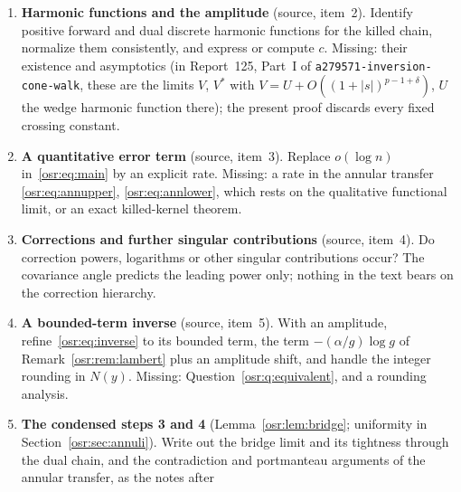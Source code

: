 \documentclass[11pt,letterpaper]{article}
\newcommand{\G}{\Gamma}\newcommand{\s}{\sqrt{17}}
\numberwithin{equation}{section}
\begin{document}
\begin{enumerate}
 \emph{Observation, not a claim.} An intake floating-point computation of
 the recurrence~\eqref{osr:eq:recurrence} (double precision with
 renormalization, not interval arithmetic) gives
 $a(n)\G^{-n}n^{\alpha}=4.154$, $4.418$, $4.557$, $4.604$, $4.627$,
 $4.641$, $4.651$ at $n=50$, $100$, $200$, $300$, $400$, $500$, $599$, still
 increasing slowly, and secant exponents
 $-\log\bigl(a(n)\G^{-n}/a(m)\G^{-m}\bigr)/\log(n/m)$, $m=\lfloor n/2\rfloor$, of
 $2.782$, $2.868$, $2.912$, $2.927$, $2.935$, $2.939$, $2.942$, approaching
 $\alpha=2.9569$ from below. This is consistent with the conjecture and
 certifies nothing; no value of $c$ is claimed.
\item\label{osr:q:harmonic} \textbf{Harmonic functions and the amplitude}
 (source, item~2). Identify positive forward and dual discrete harmonic
 functions for the killed chain, normalize them consistently, and express
 or compute $c$. Missing: their existence and asymptotics (in Report~125,
 Part~I of \nolinkurl{a279571-inversion-cone-walk}, these are the limits $V$, $V^*$ with
 $V=U+O((1+|s|)^{p-1+\delta})$, $U$ the wedge harmonic function there); the present proof discards every fixed
 crossing constant.
\item\label{osr:q:error} \textbf{A quantitative error term} (source,
 item~3). Replace $o(\log n)$ in~\eqref{osr:eq:main} by an explicit rate.
 Missing: a rate in the annular transfer \eqref{osr:eq:annupper},
 \eqref{osr:eq:annlower}, which rests on the qualitative functional limit,
 or an exact killed-kernel theorem.
\item\label{osr:q:corrections} \textbf{Corrections and further singular
 contributions} (source, item~4). Do correction powers, logarithms or other
 singular contributions occur? The covariance angle predicts the leading
 power only; nothing in the text bears on the correction hierarchy.
\item\label{osr:q:inverse} \textbf{A bounded-term inverse} (source,
 item~5). With an amplitude, refine~\eqref{osr:eq:inverse} to its bounded
 term, the term $-(\alpha/g)\log g$ of Remark~\ref{osr:rem:lambert} plus an
 amplitude shift, and handle the integer rounding in $N(y)$. Missing:
 Question~\ref{osr:q:equivalent}, and a rounding analysis.
\item\label{osr:q:sketches} \textbf{The condensed steps 3 and 4}
 (Lemma~\ref{osr:lem:bridge}; uniformity in
 Section~\ref{osr:sec:annuli}). Write out the bridge limit and its
 tightness through the dual chain, and the contradiction and portmanteau
 arguments of the annular transfer, as the notes after

\end{enumerate}
\end{document}
